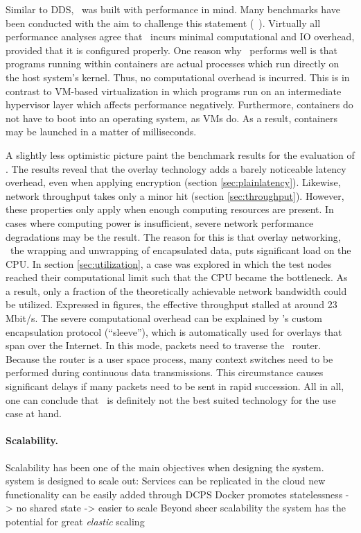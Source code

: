 Similar to DDS, \docker\ was built with performance in mind. Many benchmarks have been conducted with the aim to challenge this statement (\eg\ \cite{felter2015updated,morabito2015hypervisors}). Virtually all performance analyses agree that \docker\ incurs minimal computational and IO overhead, provided that it is configured properly. One reason why \docker\ performs well is that programs running within containers are actual processes which run directly on the host system's kernel. Thus, no computational overhead is incurred. This is in contrast to VM-based virtualization in which programs run on an intermediate hypervisor layer which affects performance negatively. Furthermore, containers do not have to boot into an operating system, as VMs do. As a result, containers may be launched in a matter of milliseconds.

A slightly less optimistic picture paint the benchmark results for the evaluation of \wnet . The results reveal that the overlay technology adds a barely noticeable latency overhead, even when applying encryption (\cf section \ref{sec:plainlatency}). Likewise, network throughput takes only a minor hit (\cf section \ref{sec:throughput}). However, these properties only apply when enough computing resources are present. In cases where computing power is insufficient, severe network performance degradations may be the result. The reason for this is that overlay networking, \ie\ the wrapping and unwrapping of encapsulated data, puts significant load on the CPU. In section \ref{sec:utilization}, a case was explored in which the test nodes reached their computational limit such that the CPU became the bottleneck. As a result, only a fraction of the theoretically achievable network bandwidth could be utilized. Expressed in figures, the effective throughput stalled at around 23 Mbit/s. The severe computational overhead can be explained by \weave 's custom encapsulation protocol (``sleeve''), which is automatically used for overlays that span over the Internet. In this mode, packets need to traverse the \weave\ router. Because the router is a user space process, many context switches need to be performed during continuous data transmissions. This circumstance causes significant delays if many packets need to be sent in rapid succession. All in all, one can conclude that \wnet\ is definitely not the best suited technology for the use case at hand.


\paragraph{Scalability.}
Scalability has been one of the main objectives when designing the system.
system is designed to scale out: 
Services can be replicated in the cloud
new functionality can be easily added through DCPS
Docker promotes statelessness -> no shared state -> easier to scale
Beyond sheer scalability the system has the potential for great \emph{elastic} scaling

